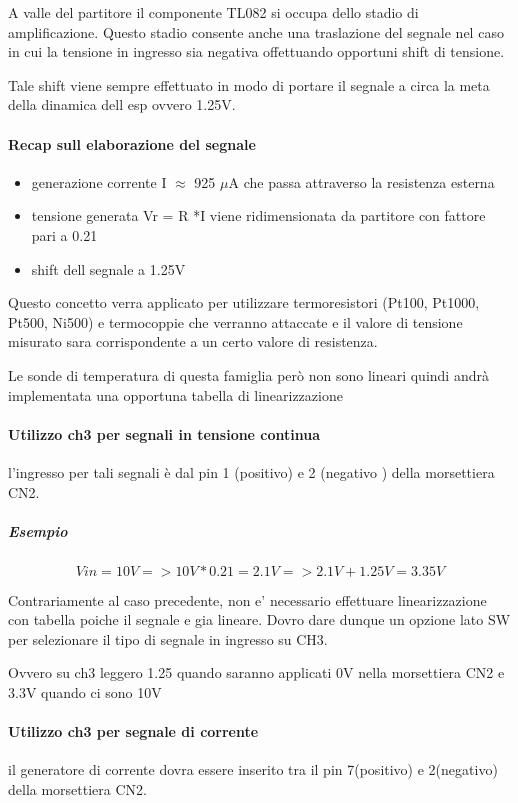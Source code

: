 \documentclass[12pt,a4paper]{report}
\begin{document}
A valle del partitore il componente TL082 si occupa dello stadio di amplificazione.
Questo stadio consente anche una traslazione del segnale nel caso in cui la tensione in ingresso sia negativa offettuando opportuni shift di tensione.

Tale shift viene sempre effettuato in modo di portare il segnale a circa la meta della dinamica dell esp ovvero 1.25V.

\paragraph{Recap sull elaborazione del segnale}
\begin{itemize}
    \item generazione corrente  I $\approx$ 925 $\mu$A che passa attraverso la resistenza esterna
    \item tensione generata Vr = R *I viene ridimensionata da partitore con fattore pari a 0.21
    \item shift dell segnale a 1.25V
\end{itemize}

Questo concetto verra applicato per utilizzare termoresistori (Pt100, Pt1000, Pt500, Ni500) e termocoppie che verranno attaccate e il valore di tensione misurato sara corrispondente a un certo valore di resistenza.

Le sonde di temperatura di questa famiglia però non sono lineari quindi andrà implementata una opportuna tabella di linearizzazione


\paragraph{Utilizzo ch3 per segnali in tensione continua}
l’ingresso per tali segnali è dal pin 1 (positivo) e 2 (negativo ) della morsettiera CN2.

\subparagraph{Esempio}

\[  
    Vin = 10V   
       => 10V * 0.21 = 2.1V
       => 2.1V + 1.25V = 3.35V
\]

Contrariamente al caso precedente, non e' necessario effettuare linearizzazione con tabella poiche il segnale e gia lineare.
Dovro dare dunque un opzione lato SW per selezionare il tipo di segnale in ingresso su CH3. 

Ovvero su ch3 leggero 1.25 quando saranno applicati 0V nella morsettiera CN2 e 3.3V quando ci sono 10V 

\paragraph{Utilizzo ch3 per segnale di corrente}
il generatore di corrente dovra essere inserito tra il pin 7(positivo) e 2(negativo) della morsettiera CN2.
\end{document}
